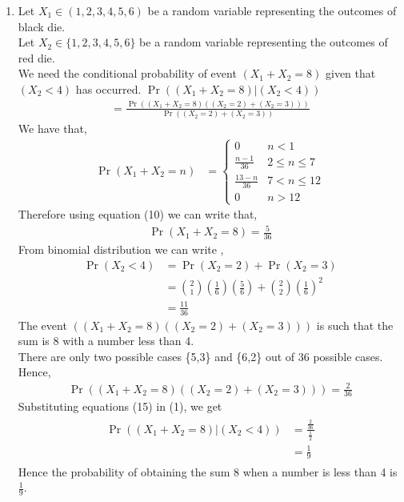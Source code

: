 \documentclass[10pt,twocolumn]{article}
\providecommand{\brak}[1]{\ensuremath{\left(#1\right)}}
\begin{document}
\begin{enumerate}
\item 
Let $X_1 \in \brak{1,2,3,4,5,6}$ be a random variable representing the outcomes of black die.\\
Let $X_2 \in \{1,2,3,4,5,6\}$ be a random variable representing the outcomes of red die. \\
We need the conditional probability of event $(X_1 + X_2 = 8)$ given that $(X_2 < 4)$ has occurred.
$\Pr{\brak{\brak{X_1 + X_2 = 8}|\brak{X_2 < 4}}}$
\begin{align}
=\frac{\Pr{((X_1 + X_2 = 8)((X_2 = 2)+(X_2 = 3)))}}{\Pr{\brak{(X_2 = 2)+(X_2 = 3)}}}
\end{align}
We have that,
\begin{align}
\Pr{(X_1 + X_2 = n)} &= 
\begin{cases}
0 & n < 1
\\
\frac{n-1}{36} &  2 \le n \le  7
\\
\frac{13-n}{36} & 7 < n \le 12
\\
0 & n > 12
\end{cases}
\end{align}
Therefore using equation (10) we can write that, 
\begin{align}
\Pr{(X_1 + X_2 = 8)} = \frac{5}{36}
\end{align}
From binomial distribution we can write ,
\begin{align}
\Pr{(X_2 < 4)}& = \Pr{(X_2=2)}+\Pr{(X_2=3)} \\ 
&= \binom{2}{1} \brak {\frac{1}{6}}\brak {\frac{5}{6}}+\binom{2}{2} \brak {\frac{1}{6}}^2\\
&= \frac{11}{36}
\end{align}
The event ${((X_1 + X_2 = 8)((X_2=2)+(X_2=3)))}$ is such that the sum is 8 with a number less than 4. \\
There are only two possible cases \{5,3\} and \{6,2\} out of 36 possible cases.\\
Hence,
\begin{align}
\Pr{((X_1 + X_2 = 8)((X_2=2)+(X_2=3)))}=\frac{2}{36}
\end{align}
Substituting equations (15) in (1), we get
\begin{align}
\begin{split}
\Pr{\brak{\brak{X_1 + X_2 = 8}|\brak{X_2 <  4}}} &= 
\frac{\frac{2}{36}}{\frac{1}{2}}\\
&=\frac{1}{9}
\end{split}
\end{align}  
Hence the probability of obtaining the sum 8 when a number is less than 4 is $\frac{1}{9}$. 

\end{enumerate}
\end{document}
